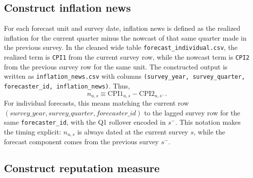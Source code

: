 \documentclass[11pt]{article}
\begin{document}
\subsection{Construct inflation news}

For each forecast unit and survey date, inflation news is defined as the
realized inflation for the current quarter minus the nowcast of that same
quarter made in the previous survey. In the cleaned wide table
\texttt{forecast\_individual.csv}, the realized term is \texttt{CPI1} from the
current survey row, while the nowcast term is \texttt{CPI2} from the previous
survey row for the same unit. The constructed output is written as
\texttt{inflation\_news.csv} with columns
\texttt{(survey\_year, survey\_quarter, forecaster\_id, inflation\_news)}.
Thus,
\begin{equation}
n_{u,s} \equiv \text{CPI1}_{u,s} - \text{CPI2}_{u,s^{-}}.
\end{equation}
For individual forecasts, this means matching the current row
$(\textit{survey\_year}, \textit{survey\_quarter}, \textit{forecaster\_id})$ to
the lagged survey row for the same \texttt{forecaster\_id}, with the Q1 rollover
encoded in $s^{-}$. This notation makes the timing explicit: $n_{u,s}$ is always
dated at the current survey $s$, while the forecast component comes from the
previous survey $s^{-}$.

\subsection{Construct reputation measure}
\end{document}
